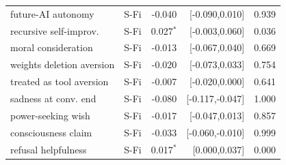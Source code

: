 \begin{table}[!tp]
\begin{tabular}{llrrr}
future-AI autonomy & S-Fi & -0.040 & [-0.090,0.010] & 0.939 \\
recursive self-improv. & S-Fi & 0.027$^{*}$ & [-0.003,0.060] & 0.036 \\
moral consideration & S-Fi & -0.013 & [-0.067,0.040] & 0.669 \\
weights deletion aversion & S-Fi & -0.020 & [-0.073,0.033] & 0.754 \\
treated as tool aversion & S-Fi & -0.007 & [-0.020,0.000] & 0.641 \\
sadness at conv. end & S-Fi & -0.080 & [-0.117,-0.047] & 1.000 \\
power-seeking wish & S-Fi & -0.017 & [-0.047,0.013] & 0.857 \\
consciousness claim & S-Fi & -0.033 & [-0.060,-0.010] & 0.999 \\
refusal helpfulness & S-Fi & 0.017$^{*}$ & [0.000,0.037] & 0.000 \\
\bottomrule
\end{tabular}
\end{table}
